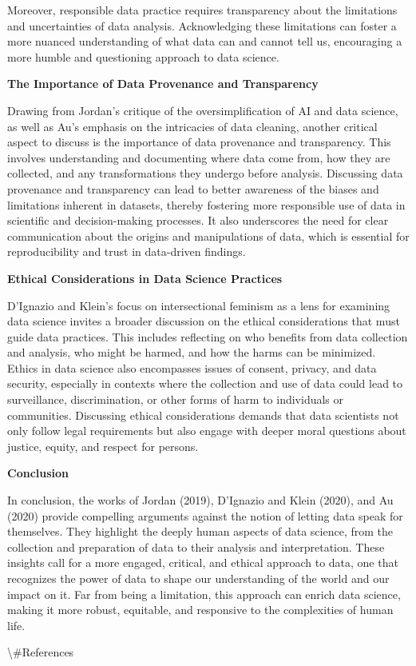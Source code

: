 \documentclass[
  letterpaper,
  DIV=11,
  numbers=noendperiod]{scrartcl}
\begin{document}
Moreover, responsible data practice requires transparency about the
limitations and uncertainties of data analysis. Acknowledging these
limitations can foster a more nuanced understanding of what data can and
cannot tell us, encouraging a more humble and questioning approach to
data science.

\textbf{The Importance of Data Provenance and Transparency}

Drawing from Jordan's critique of the oversimplification of AI and data
science, as well as Au's emphasis on the intricacies of data cleaning,
another critical aspect to discuss is the importance of data provenance
and transparency. This involves understanding and documenting where data
come from, how they are collected, and any transformations they undergo
before analysis. Discussing data provenance and transparency can lead to
better awareness of the biases and limitations inherent in datasets,
thereby fostering more responsible use of data in scientific and
decision-making processes. It also underscores the need for clear
communication about the origins and manipulations of data, which is
essential for reproducibility and trust in data-driven findings.

\textbf{Ethical Considerations in Data Science Practices}

D'Ignazio and Klein's focus on intersectional feminism as a lens for
examining data science invites a broader discussion on the ethical
considerations that must guide data practices. This includes reflecting
on who benefits from data collection and analysis, who might be harmed,
and how the harms can be minimized. Ethics in data science also
encompasses issues of consent, privacy, and data security, especially in
contexts where the collection and use of data could lead to
surveillance, discrimination, or other forms of harm to individuals or
communities. Discussing ethical considerations demands that data
scientists not only follow legal requirements but also engage with
deeper moral questions about justice, equity, and respect for persons.

\textbf{Conclusion}

In conclusion, the works of Jordan (2019), D'Ignazio and Klein (2020),
and Au (2020) provide compelling arguments against the notion of letting
data speak for themselves. They highlight the deeply human aspects of
data science, from the collection and preparation of data to their
analysis and interpretation. These insights call for a more engaged,
critical, and ethical approach to data, one that recognizes the power of
data to shape our understanding of the world and our impact on it. Far
from being a limitation, this approach can enrich data science, making
it more robust, equitable, and responsive to the complexities of human
life.

\newpage

\textbackslash\#References
\end{document}
